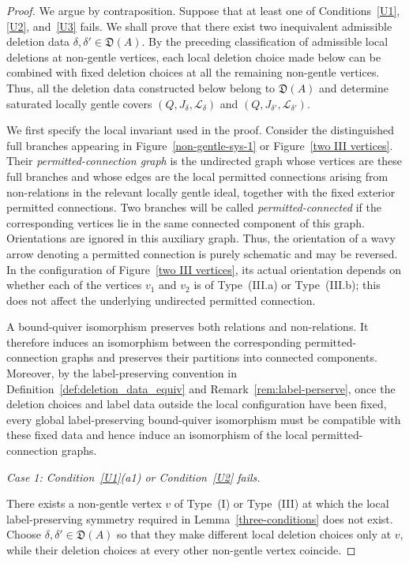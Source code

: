 \documentclass[11pt]{amsart}
\numberwithin{equation}{section}
\theoremstyle{definition}
\begin{document}
\begin{proof}
We argue by contraposition. Suppose that at least one of
Conditions~\ref{U1}, \ref{U2}, and~\ref{U3} fails. We shall prove
that there exist two inequivalent admissible deletion data $\delta,\delta'\in\mathfrak D(A)$.
By the preceding classification of admissible local deletions at
non-gentle vertices, each local deletion choice made below can be
combined with fixed deletion choices at all the remaining non-gentle
vertices. Thus, all the deletion data constructed below belong to
\(\mathfrak D(A)\) and determine saturated locally gentle covers
$(Q,J_{\delta},\mathcal L_{\delta})$ and $(Q,J_{\delta'},\mathcal L_{\delta'})$. 


We first specify the local invariant used in the proof. Consider the
distinguished full branches appearing in Figure~\ref{non-gentle-sys-1}
or Figure~\ref{two III vertices}. Their \emph{permitted-connection
graph} is the undirected graph whose vertices are these full branches
and whose edges are the local permitted connections arising from
non-relations in the relevant locally gentle ideal, together with the
fixed exterior permitted connections. Two branches will be called
\emph{permitted-connected} if the corresponding vertices lie in the
same connected component of this graph. Orientations are ignored in
this auxiliary graph. Thus, the orientation of a wavy arrow denoting
a permitted connection is purely schematic and may be reversed. In
the configuration of Figure~\ref{two III vertices}, its actual
orientation depends on whether each of the vertices \(v_1\) and
\(v_2\) is of Type~\textup{(III.a)} or Type~\textup{(III.b)}; this
does not affect the underlying undirected permitted connection.

A bound-quiver isomorphism preserves both relations and
non-relations. It therefore induces an isomorphism between the
corresponding permitted-connection graphs and preserves their
partitions into connected components. Moreover, by the
label-preserving convention in
Definition~\ref{def:deletion_data_equiv} and
Remark~\ref{rem:label-perserve}, once the deletion choices and label
data outside the local configuration have been fixed, every global
label-preserving bound-quiver isomorphism must be compatible with
these fixed data and hence induce an isomorphism of the local
permitted-connection graphs.

\smallskip
\noindent
\emph{Case 1: Condition~\ref{U1}\textup{(a1)} or
Condition~\ref{U2} fails.}

There exists a non-gentle vertex \(v\) of Type~\textup{(I)} or
Type~\textup{(III)} at which the local label-preserving symmetry
required in Lemma~\ref{three-conditions} does not exist. Choose
\(\delta,\delta'\in\mathfrak D(A)\) so that they make different local
deletion choices only at \(v\), while their deletion choices at every
other non-gentle vertex coincide.


\end{proof}
\end{document}
